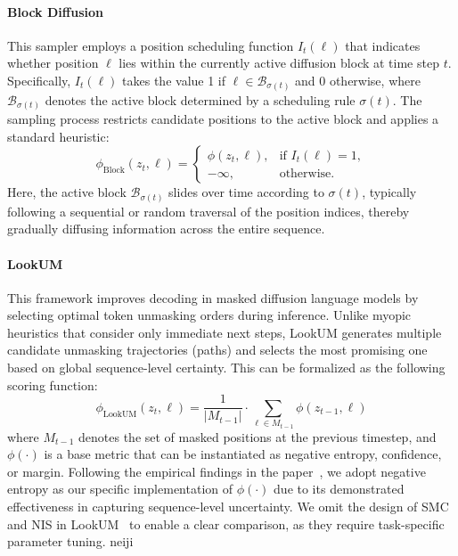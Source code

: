 \paragraph{Block Diffusion~\cite{arriola2025block,wu2025fast}} This sampler employs a position scheduling function $I_t(\ell)$ that indicates whether position $\ell$ lies within the currently active diffusion block at time step $t$. Specifically, $I_t(\ell)$ takes the value 1 if $\ell \in \mathcal{B}_{\sigma(t)}$ and 0 otherwise, where $\mathcal{B}_{\sigma(t)}$ denotes the active block determined by a scheduling rule $\sigma(t)$. The sampling process restricts candidate positions to the active block and applies a standard heuristic:
\begin{equation}
\phi_{\text{Block}}(z_t, \ell) = 
\begin{cases} 
\phi(z_t, \ell), & \text{if } I_t(\ell) = 1, \\
-\infty, & \text{otherwise}.
\end{cases}
\end{equation}
Here, the active block $\mathcal{B}_{\sigma(t)}$ slides over time according to $\sigma(t)$, typically following a sequential or random traversal of the position indices, thereby gradually diffusing information across the entire sequence.


\paragraph{LookUM~\cite{lee2025lookahead}}
This framework improves decoding in masked diffusion language models by selecting optimal token unmasking orders during inference. Unlike myopic heuristics that consider only immediate next steps, LookUM generates multiple candidate unmasking trajectories (paths) and selects the most promising one based on global sequence-level certainty. This can be formalized as the following scoring function:
\begin{equation}
    \phi_{\text{LookUM}}(z_t, \ell) = \frac{1}{|M_{t-1}|} \cdot\sum_{\ell \in M_{t-1}}\phi(z_{t-1}, \ell)
\end{equation}
where $M_{t-1}$ denotes the set of masked positions at the previous timestep, and $\phi(\cdot)$ is a base metric that can be instantiated as negative entropy, confidence, or margin. Following the empirical findings in the paper~\cite{lee2025lookahead}, we adopt negative entropy as our specific implementation of $\phi(\cdot)$ due to its demonstrated effectiveness in capturing sequence-level uncertainty. We omit the design of SMC and NIS in LookUM~\cite{lee2025lookahead} to enable a clear comparison, as they require task-specific parameter tuning.
neiji






